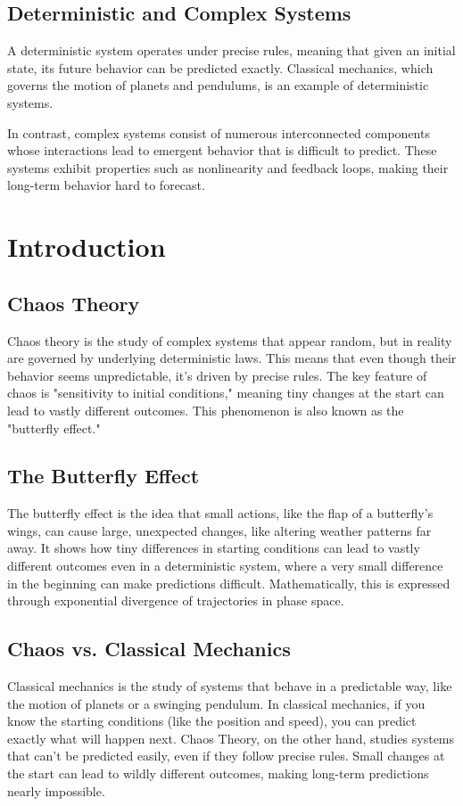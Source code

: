 \documentclass[12pt]{article}
\begin{document}
\subsection{Deterministic and Complex Systems}
A deterministic system operates under precise rules, meaning that given an initial state, its future behavior can be predicted exactly. Classical mechanics, which governs the motion of planets and pendulums, is an example of deterministic systems.

In contrast, complex systems consist of numerous interconnected components whose interactions lead to emergent behavior that is difficult to predict. These systems exhibit properties such as nonlinearity and feedback loops, making their long-term behavior hard to forecast.

\section{Introduction}


\subsection{Chaos Theory}
Chaos theory is the study of complex systems that appear random, but in reality are governed by underlying deterministic laws. This means that even though their behavior seems unpredictable, it's driven by precise rules. The key feature of chaos is "sensitivity to initial conditions," meaning tiny changes at the start can lead to vastly different outcomes. This phenomenon is also known as the "butterfly effect."

\subsection{The Butterfly Effect}
The butterfly effect is the idea that small actions, like the flap of a butterfly’s wings, can cause large, unexpected changes, like altering weather patterns far away. It shows how tiny differences in starting conditions can lead to vastly different outcomes even in a deterministic system, where a very small difference in the beginning can make predictions difficult. Mathematically, this is expressed through exponential divergence of trajectories in phase space.

\subsection{Chaos vs. Classical Mechanics}
Classical mechanics is the study of systems that behave in a predictable way, like the motion of planets or a swinging pendulum. In classical mechanics, if you know the starting conditions (like the position and speed), you can predict exactly what will happen next. Chaos Theory, on the other hand, studies systems that can’t be predicted easily, even if they follow precise rules. Small changes at the start can lead to wildly different outcomes, making long-term predictions nearly impossible.
\end{document}
